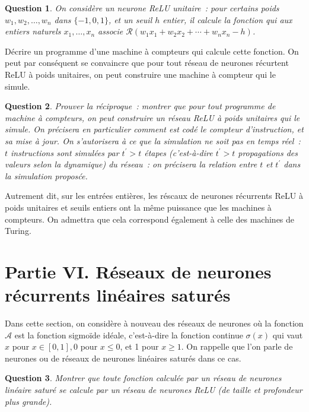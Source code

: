 \documentclass[10pt]{article}
\newtheorem{question}{Question}
\begin{document}
\begin{question}
	On considère un neurone ReLU unitaire : pour certains poids $w_{1}, w_{2}, \ldots, w_{n}$ dans $\{-1,0,1\}$, et un seuil $h$ entier, il calcule la fonction qui aux entiers naturels $x_{1}, \ldots, x_{n}$ associe $\mathcal{R}\left(w_{1} x_{1}+w_{2} x_{2}+\cdots+w_{n} x_{n}-h\right)$.
\end{question}

Décrire un programme d'une machine à compteurs qui calcule cette fonction. On peut par conséquent se convaincre que pour tout réseau de neurones récurtent ReLU à poids unitaires, on peut construire une machine à compteur qui le simule.

\begin{question}
	Prouver la réciproque : montrer que pour tout programme de machine à compteurs, on peut construire un réseau ReLU à poids unitaires qui le simule. On précisera en particulier comment est codé le compteur d'instruction, et sa mise à jour. On s'autorisera à ce que la simulation ne soit pas en temps réel : $t$ instructions sont simulées par $t^{\prime}>t$ étapes (c'est-à-dire $t^{\prime}>t$ propagations des valeurs selon la dynamique) du réseau : on précisera la relation entre $t$ et $t^{\prime}$ dans la simulation proposće.
\end{question}

Autrement dit, sur les entrées entières, les réscaux de neurones récurrents ReLU à poids unitaires et seuils entiers ont la même puissance que les machines à compteurs. On admettra que cela correspond également à celle des machines de Turing.

\section{Partie VI. Réseaux de neurones récurrents linéaires saturés}
Dans cette section, on considère à nouveau des réseaux de neurones où la fonction $\mathcal{A}$ est la fonction sigmoïde idéale, c'est-à-dire la fonction continue $\sigma(x)$ qui vaut $x$ pour $x \in[0,1], 0$ pour $x ≤ 0$, et 1 pour $x ≥ 1$. On rappelle que l'on parle de neurones ou de réseaux de neurones linéaires saturés dans ce cas.

\begin{question}
	Montrer que toute fonction calculée par un réseau de neurones linéaire saturé se calcule par un réseau de neurones ReLU (de taille et profondeur plus grande).
\end{question}
\end{document}

